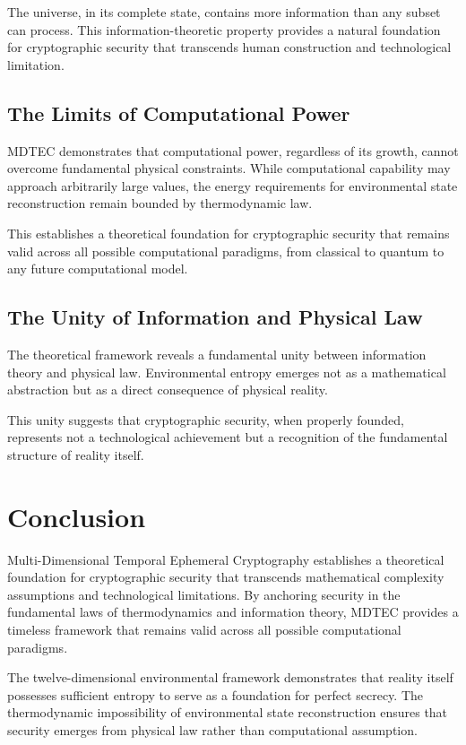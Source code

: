 \documentclass[12pt]{article}
\begin{document}
The universe, in its complete state, contains more information than any subset can process. This information-theoretic property provides a natural foundation for cryptographic security that transcends human construction and technological limitation.

\subsection{The Limits of Computational Power}

MDTEC demonstrates that computational power, regardless of its growth, cannot overcome fundamental physical constraints. While computational capability may approach arbitrarily large values, the energy requirements for environmental state reconstruction remain bounded by thermodynamic law.

This establishes a theoretical foundation for cryptographic security that remains valid across all possible computational paradigms, from classical to quantum to any future computational model.

\subsection{The Unity of Information and Physical Law}

The theoretical framework reveals a fundamental unity between information theory and physical law. Environmental entropy emerges not as a mathematical abstraction but as a direct consequence of physical reality.

This unity suggests that cryptographic security, when properly founded, represents not a technological achievement but a recognition of the fundamental structure of reality itself.

\section{Conclusion}

Multi-Dimensional Temporal Ephemeral Cryptography establishes a theoretical foundation for cryptographic security that transcends mathematical complexity assumptions and technological limitations. By anchoring security in the fundamental laws of thermodynamics and information theory, MDTEC provides a timeless framework that remains valid across all possible computational paradigms.

The twelve-dimensional environmental framework demonstrates that reality itself possesses sufficient entropy to serve as a foundation for perfect secrecy. The thermodynamic impossibility of environmental state reconstruction ensures that security emerges from physical law rather than computational assumption.
\end{document}
